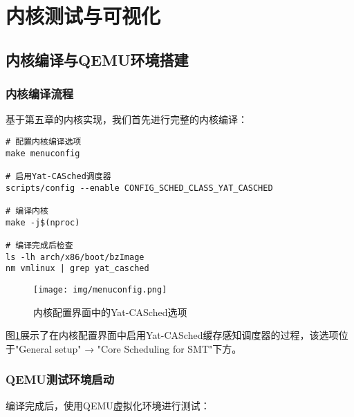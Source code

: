 
\section{内核测试与可视化} \label{sec:test}

\subsection{内核编译与QEMU环境搭建}

\subsubsection{内核编译流程}
基于第五章的内核实现，我们首先进行完整的内核编译：
\begin{tcolorbox} [
    enhanced,
    colback=blue!5,
    colframe=blue!40!black,
    leftrule=3mm,
    rightrule=0mm,
    toprule=0mm,
    bottomrule=0mm,
    arc=2mm,
    left=5mm,
    right=5mm,
    top=3mm,
    bottom=3mm,
    fonttitle=\bfseries,
    title=\textbf{内核编译命令}
]
\begin{lstlisting}[basicstyle=\footnotesize\fontfamily{zi4}\selectfont, showstringspaces=false]
# 配置内核编译选项
make menuconfig

# 启用Yat-CASched调度器
scripts/config --enable CONFIG_SCHED_CLASS_YAT_CASCHED

# 编译内核
make -j$(nproc)

# 编译完成后检查
ls -lh arch/x86/boot/bzImage
nm vmlinux | grep yat_casched
\end{lstlisting}
\end{tcolorbox}

\begin{figure}[H]
\centering
\texttt{[image: img/menuconfig.png]}

\caption{内核配置界面中的Yat-CASched选项}
\label{fig:menuconfig}
\end{figure}

图\ref{fig:menuconfig}展示了在内核配置界面中启用Yat-CASched缓存感知调度器的过程，该选项位于"General setup" → "Core Scheduling for SMT"下方。

\subsubsection{QEMU测试环境启动}
编译完成后，使用QEMU虚拟化环境进行测试：

